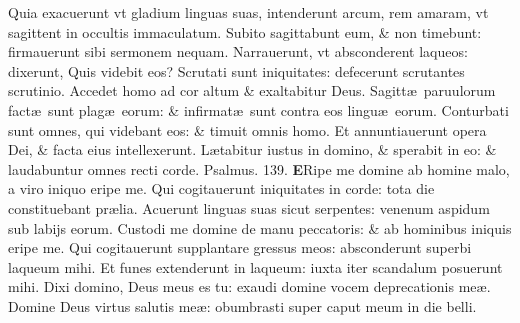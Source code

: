 \documentclass[a5paper,10pt]{book}
\def\ae{æ}
\begin{document}
\begin{multicols*}{2}
\newline \color{red} Q\color{black}uia exacuerunt vt gladium linguas suas, intenderunt arcum, rem amaram, vt sagittent in occultis immaculatum.
\newline \color{red} S\color{black}ubito sagittabunt eum, \& non timebunt: firmauerunt sibi sermonem nequam.
\newline \color{red} N\color{black}arrauerunt, vt absconderent laqueos: dixerunt, Quis videbit eos?
\newline \color{red} S\color{black}crutati sunt iniquitates: defecerunt scrutantes scrutinio.
\newline \color{red} A\color{black}ccedet homo ad cor altum \& exaltabitur Deus.
\newline \color{red} S\color{black}agitt\ae \ paruulorum fact\ae \ sunt plag\ae \ eorum: \& infirmat\ae \ sunt contra eos lingu\ae \ eorum.
\newline \color{red} C\color{black}onturbati sunt omnes, qui videbant eos: \& timuit omnis homo.
\newline \color{red} E\color{black}t annuntiauerunt opera Dei, \& facta eius intellexerunt.
\newline \color{red} L\color{black}\ae tabitur iustus in domino, \& sperabit in eo: \& laudabuntur omnes recti corde. \quad \color{red} Psalmus. 139. \color{black}
\lettrine[lines=2]{\bfseries \color{red} E}{}Ripe me domine ab homine malo, a viro iniquo eripe me.
\newline \color{red} Q\color{black}ui cogitauerunt iniquitates in corde: tota die constituebant pr\ae lia.
\newline \color{red} A\color{black}cuerunt linguas suas sicut serpentes: venenum aspidum sub labijs eorum.%
\newline \color{red} C\color{black}ustodi me domine de manu peccatoris: \& ab hominibus iniquis eripe me.
\newline \color{red} Q\color{black}ui cogitauerunt supplantare gressus meos: absconderunt superbi laqueum mihi.
\newline \color{red} E\color{black}t funes extenderunt in laqueum: iuxta iter scandalum posuerunt mihi.
\newline \color{red} D\color{black}ixi domino, Deus meus es tu: exaudi domine vocem deprecationis me\ae .
\newline \color{red} D\color{black}omine Deus virtus salutis me\ae : obumbrasti super caput meum in die belli.%

\end{multicols*}
\end{document}

